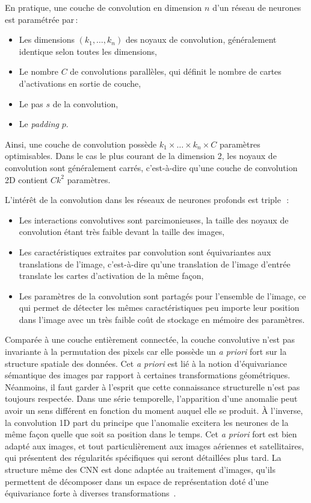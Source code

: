 En pratique, une couche de convolution en dimension $n$ d'un réseau de neurones est paramétrée par\,:
\begin{itemize}
  \item Les dimensions $(k_1, \dots, k_n)$ des noyaux de convolution, généralement identique selon toutes les dimensions,
  \item Le nombre $C$ de convolutions parallèles, qui définit le nombre de cartes d'activations en sortie de couche,
  \item Le pas $s$ de la convolution,
  \item Le \emph{padding} $p$.
\end{itemize}

Ainsi, une couche de convolution possède $k_1 \times \dots \times k_n \times C$ paramètres optimisables. Dans le cas le plus courant de la dimension 2, les noyaux de convolution sont généralement carrés, c'est-à-dire qu'une couche de convolution 2D contient $C k^2$ paramètres.

L'intérêt de la convolution dans les réseaux de neurones profonds est triple~\cite{goodfellow_deep_2016}\,:
\begin{itemize}
  \item Les interactions convolutives sont parcimonieuses, la taille des noyaux de convolution étant très faible devant la taille des images,
  \item Les caractéristiques extraites par convolution sont équivariantes aux translations de l'image, c'est-à-dire qu'une translation de l'image d'entrée translate les cartes d'activation de la même façon,
  \item Les paramètres de la convolution sont partagés pour l'ensemble de l'image, ce qui permet de détecter les mêmes caractéristiques peu importe leur position dans l'image avec un très faible coût de stockage en mémoire des paramètres.
\end{itemize}
Comparée à une couche entièrement connectée, la couche convolutive n'est pas invariante à la permutation des pixels car elle possède un \emph{a priori} fort sur la structure spatiale des données. Cet \emph{a priori} est lié à la notion d'équivariance sémantique des images par rapport à certaines transformations géométriques. Néanmoins, il faut garder à l'esprit que cette connaissance structurelle n'est pas toujours respectée. Dans une série temporelle, l'apparition d'une anomalie peut avoir un sens différent en fonction du moment auquel elle se produit. À l'inverse, la convolution 1D part du principe que l'anomalie excitera les neurones de la même façon quelle que soit sa position dans le temps. Cet \emph{a priori} fort est bien adapté aux images, et tout particulièrement aux images aériennes et satellitaires, qui présentent des régularités spécifiques qui seront détaillées plus tard. La structure même des \gls{CNN} est donc adaptée au traitement d'images, qu'ils permettent de décomposer dans un espace de représentation doté d'une équivariance forte à diverses transformations~\cite{ulyanov_deep_2017}.

